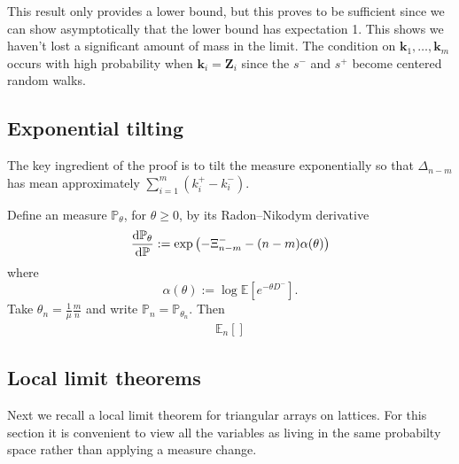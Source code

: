 \documentclass[draft]{scrartcl}
\newcommand{\E}{\mathbb E}
\newcommand{\defeq}{:=}
\newcommand{\vect}{\mathbf}
\renewcommand{\Pr}{\mathbb P}
\begin{document}
This result only provides a lower bound, but this proves to be sufficient since we can show asymptotically that the lower bound has expectation 1. This shows we haven't lost a significant amount of mass in the limit. The condition on $\vect{k}_1, \ldots, \vect{k}_m$ occurs with high probability when $\vect{k}_i = \vect{Z}_i$ since the $s^-$ and $s^+$ become centered random walks.

\subsection{Exponential tilting}

The key ingredient of the proof is to tilt the measure exponentially so that $\Delta_{n-m}$ has mean approximately $\sum_{i=1}^m (k^+_i - k^-_i)$.

\begin{lemma}
    Define an measure $\Pr_{\theta}$, for $\theta \geq 0$, by its Radon--Nikodym derivative
    \begin{equation}
        \diff{\Pr_{\theta}}{\Pr} \defeq \exp\left( - \Xi^-_{n-m} - (n-m) \alpha(\theta) \right)
    \end{equation}
    where
    \begin{equation}
        \alpha(\theta) \defeq \log \E \left[ e^{-\theta D^-} \right].
    \end{equation}
    Take $\theta_n = \frac{1}{\mu} \frac{m}{n}$ and write $\Pr_n = \Pr_{\theta_n}$. Then
    \begin{align}
        \E_n[]
    \end{align}
\end{lemma}

\subsection{Local limit theorems}

Next we recall a local limit theorem for triangular arrays on lattices. For this section it is convenient to view all the variables as living in the same probabilty space rather than applying a measure change.

\printbibliography
\end{document}
